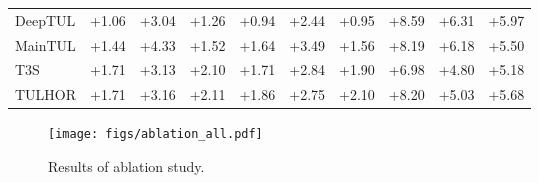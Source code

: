 \documentclass{article} %
\theoremstyle{definition}
\begin{document}
\begin{table}[h]
\begin{tabular}{lccccccccc}
        DeepTUL  & {\cellcolor[HTML]{EEF8A8}} \color[HTML]{000000} +1.06 & {\cellcolor[HTML]{CBE982}} \color[HTML]{000000} +3.04 & {\cellcolor[HTML]{EBF7A3}} \color[HTML]{000000} +1.26 & {\cellcolor[HTML]{EFF8AA}} \color[HTML]{000000} +0.94 & {\cellcolor[HTML]{D9EF8B}} \color[HTML]{000000} +2.44 & {\cellcolor[HTML]{EFF8AA}} \color[HTML]{000000} +0.95 & {\cellcolor[HTML]{39A758}} \color[HTML]{000000} +8.59 & {\cellcolor[HTML]{7DC765}} \color[HTML]{000000} +6.31 & {\cellcolor[HTML]{87CB67}} \color[HTML]{000000} +5.97 \\
        MainTUL  & {\cellcolor[HTML]{E8F59F}} \color[HTML]{000000} +1.44 & {\cellcolor[HTML]{AFDD70}} \color[HTML]{000000} +4.33 & {\cellcolor[HTML]{E6F59D}} \color[HTML]{000000} +1.52 & {\cellcolor[HTML]{E5F49B}} \color[HTML]{000000} +1.64 & {\cellcolor[HTML]{C1E57B}} \color[HTML]{000000} +3.49 & {\cellcolor[HTML]{E6F59D}} \color[HTML]{000000} +1.56 & {\cellcolor[HTML]{45AD5B}} \color[HTML]{000000} +8.19 & {\cellcolor[HTML]{82C966}} \color[HTML]{000000} +6.18 & {\cellcolor[HTML]{93D168}} \color[HTML]{000000} +5.50 \\
        T3S      & {\cellcolor[HTML]{E3F399}} \color[HTML]{000000} +1.71 & {\cellcolor[HTML]{C9E881}} \color[HTML]{000000} +3.13 & {\cellcolor[HTML]{DDF191}} \color[HTML]{000000} +2.10 & {\cellcolor[HTML]{E3F399}} \color[HTML]{000000} +1.71 & {\cellcolor[HTML]{CFEB85}} \color[HTML]{000000} +2.84 & {\cellcolor[HTML]{E0F295}} \color[HTML]{000000} +1.90 & {\cellcolor[HTML]{6BBF64}} \color[HTML]{000000} +6.98 & {\cellcolor[HTML]{A5D86A}} \color[HTML]{000000} +4.80 & {\cellcolor[HTML]{9BD469}} \color[HTML]{000000} +5.18 \\
        TULHOR   & {\cellcolor[HTML]{E3F399}} \color[HTML]{000000} +1.71 & {\cellcolor[HTML]{C9E881}} \color[HTML]{000000} +3.16 & {\cellcolor[HTML]{DDF191}} \color[HTML]{000000} +2.11 & {\cellcolor[HTML]{E2F397}} \color[HTML]{000000} +1.86 & {\cellcolor[HTML]{D1EC86}} \color[HTML]{000000} +2.75 & {\cellcolor[HTML]{DDF191}} \color[HTML]{000000} +2.10 & {\cellcolor[HTML]{45AD5B}} \color[HTML]{000000} +8.20 & {\cellcolor[HTML]{A0D669}} \color[HTML]{000000} +5.03 & {\cellcolor[HTML]{8ECF67}} \color[HTML]{000000} +5.68 \\
        \bottomrule
    \end{tabular}
\end{table}


\begin{figure}[h]
    \centering
    \texttt{[image: figs/ablation\_all.pdf]}
    \caption{Results of ablation study.}
    \label{fig:ablation}
\end{figure}
\end{document}
